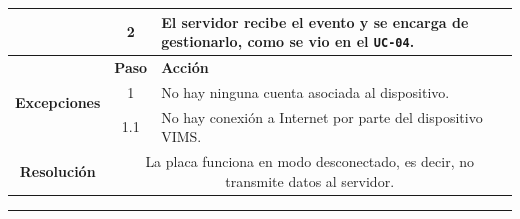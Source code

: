 \begin{table}[H]
\begin{tabularx}{\textwidth}{|c|c|X|}
    \cline{2-3}
                                                & 2                                                                                                                                                 & \multicolumn{1}{L|}{El servidor recibe el evento y se encarga de gestionarlo, como se vio en el \texttt{UC-04}.}                                                        \\
    \hline
    \multirow{3}{*}{\textbf{Excepciones}}       & \textbf{Paso}                                                                                                                                     & \textbf{Acción}                                                                                                                                                         \\
    \cline{2-3}
                                                & 1                                                                                                                                                 & \multicolumn{1}{L|}{No hay ninguna cuenta asociada al dispositivo.}                                                                                                     \\
    \cline{2-3}
                                                & 1.1                                                                                                                                               & \multicolumn{1}{L|}{No hay conexión a Internet por parte del dispositivo \ac{VIMS}.}                                                                                    \\
    \hline\hline
    \textbf{Resolución}                         & \multicolumn{2}{X|}{La placa funciona en modo desconectado, es decir, no transmite datos al servidor.}                                                                                                                                                                                                                      \\
    \hline
  \end{tabularx}
\end{table}

\noindent\rule{\linewidth}{.2pt}

